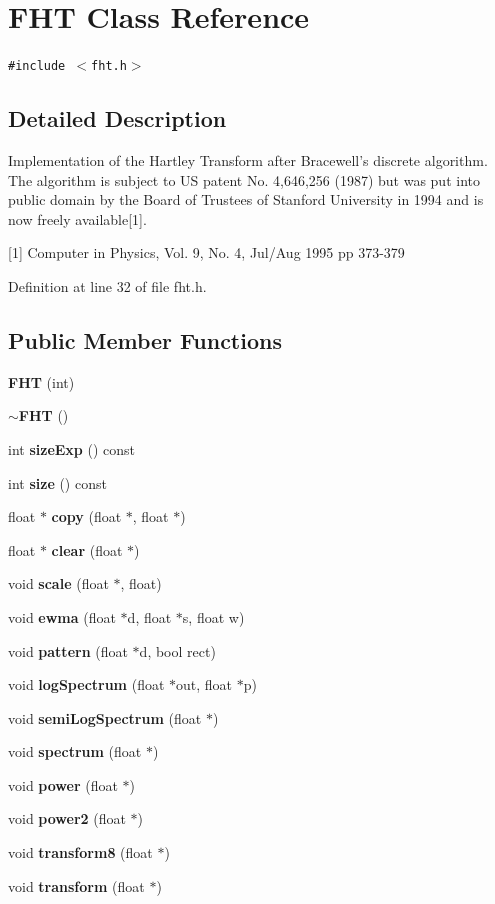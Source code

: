 \section{FHT Class Reference}
\label{classFHT}
{\tt \#include $<$fht.h$>$}



\subsection{Detailed Description}
Implementation of the Hartley Transform after Bracewell's discrete algorithm. The algorithm is subject to US patent No. 4,646,256 (1987) but was put into public domain by the Board of Trustees of Stanford University in 1994 and is now freely available[1].

[1] Computer in Physics, Vol. 9, No. 4, Jul/Aug 1995 pp 373-379 



Definition at line 32 of file fht.h.\subsection*{Public Member Functions}
\begin{CompactItemize}
\item 
{\bf FHT} (int)
\item 
{\bf $\sim$FHT} ()
\item 
int {\bf size\-Exp} () const 
\item 
int {\bf size} () const 
\item 
float $\ast$ {\bf copy} (float $\ast$, float $\ast$)
\item 
float $\ast$ {\bf clear} (float $\ast$)
\item 
void {\bf scale} (float $\ast$, float)
\item 
void {\bf ewma} (float $\ast$d, float $\ast$s, float w)
\item 
void {\bf pattern} (float $\ast$d, bool rect)
\item 
void {\bf log\-Spectrum} (float $\ast$out, float $\ast$p)
\item 
void {\bf semi\-Log\-Spectrum} (float $\ast$)
\item 
void {\bf spectrum} (float $\ast$)
\item 
void {\bf power} (float $\ast$)
\item 
void {\bf power2} (float $\ast$)
\item 
void {\bf transform8} (float $\ast$)
\item 
void {\bf transform} (float $\ast$)
\end{CompactItemize}
